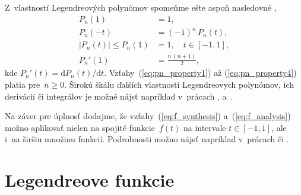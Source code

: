 \documentclass[a4paper, 12pt]{book}
\newcommand{\diff}{\mathrm d}
\begin{document}
Z~vlastností Legendreových polynómov spomeňme ešte aspoň nasledovné
\parencite{Freeden2009},
%
\begin{align}
\label{eq:pn_property1}
P_n(1) &= 1{,}\\
%
\label{eq:pn_property2}
P_n(-t) &= (-1)^n \, P_n(t){,}\\
%
\label{eq:pn_property3}
|P_n(t)| \leq P_n(1) &= 1{,} \quad t \in [-1, 1]{,}\\
%
\label{eq:pn_property4}
P_n'(1) &= \frac{n \, (n + 1)}{2}{,}
\end{align}
%
kde $P_n'(t) = \diff P_n(t) \slash \diff t$.  Vzťahy~(\ref{eq:pn_property1}) až
(\ref{eq:pn_property4}) platia pre~$n \geq 0$.   Širokú škálu ďalších
vlastností Legendreovych polynómov, ich derivácií či integrálov je možné nájsť
napríklad v~prácach \textcite{Gradshteyn2007}, \textcite{Freeden2009}
a~\textcite{Olver2010}.

Na záver pre úplnosť dodajme, že vzťahy~(\ref{eq:f_synthesis})
a~(\ref{eq:f_analysis}) možno aplikovať nielen na spojité funkcie~$f(t)$ na
intervale $t \in [-1, 1]$, ale i~na širšiu množinu funkcií.  Podrobnosti možno
nájsť napríklad v~prácach \textcite{Freeden2009} či \textcite{Arfken2005}.






\section{Legendreove funkcie}
\label{sec:legendre_functions}
\end{document}
